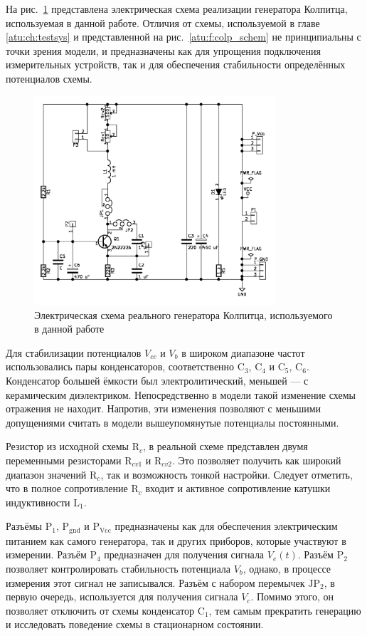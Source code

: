 На рис.~\ref{atu:f:colp_schem_real} представлена электрическая схема
реализации генератора Колпитца, используемая в данной работе.
Отличия от схемы, используемой в главе \ref{atu:ch:testsys}
и представленной на рис.~\ref{atu:f:colp_schem}
не принципиальны с точки зрения модели,
и предназначены как для упрощения подключения
измерительных устройств, так и для
обеспечения стабильности определённых потенциалов схемы.

\begin{figure}[htb!]
\centerline{\includegraphics[width=0.8\textwidth]{p/colp_schem_real.png} }
\caption{Электрическая схема реального генератора Колпитца, используемого в данной работе}
\label{atu:f:colp_schem_real}
\end{figure}

Для стабилизации потенциалов $V_{cc}$ и $V_b$
в широком диапазоне частот использовались пары конденсаторов, соответственно
$\mathrm{C}_3$, $\mathrm{C}_4$ и
$\mathrm{C}_5$, $\mathrm{C}_6$. Конденсатор большей ёмкости
был электролитический, меньшей --- с керамическим диэлектриком.
Непосредственно в модели такой изменение схемы отражения не находит.
Напротив, эти изменения позволяют с меньшими допущениями считать
в модели вышеупомянутые потенциалы постоянными.

Резистор из исходной схемы $\mathrm{R}_c$,
в реальной схеме представлен двумя переменными резисторами
$\mathrm{R}_{cv1}$ и
$\mathrm{R}_{cv2}$. Это позволяет получить как широкий диапазон значений $\mathrm{R}_c$,
так и возможность тонкой настройки.
Следует отметить, что в полное сопротивление $\mathrm{R}_c$
входит и активное сопротивление катушки индуктивности $\mathrm{L}_{1}$.

Разъёмы $\mathrm{P}_1$, $\mathrm{P}_\mathrm{gnd}$ и $\mathrm{P}_\mathrm{Vcc}$
предназначены как для обеспечения электрическим питанием как самого генератора,
так и других приборов, которые участвуют в измерении.
Разъём $\mathrm{P}_4$ предназначен для получения сигнала $V_e(t)$.
Разъём $\mathrm{P}_2$ позволяет контролировать стабильность
потенциала $V_b$, однако, в процессе измерения этот сигнал не записывался.
Разъём с набором перемычек $\mathrm{JP}_2$, в первую очередь,
используется для получения сигнала $V_c$. Помимо этого,
он позволяет отключить от схемы конденсатор $\mathrm{C}_1$,
тем самым прекратить генерацию и исследовать поведение схемы в стационарном состоянии.

